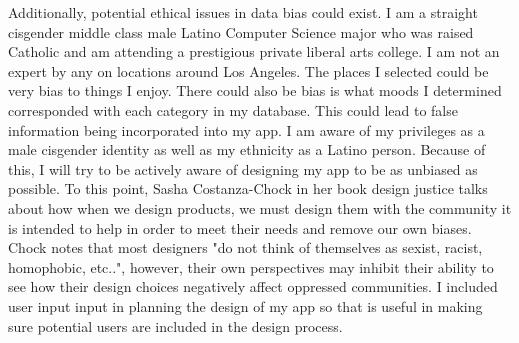 \documentclass[12pt,twocolumn]{article}
\begin{document}
Additionally, potential ethical issues in data bias could exist. I am a straight cisgender middle class male Latino Computer Science major who was raised Catholic and am attending a prestigious private liberal arts college. I am not an expert by any on locations around Los Angeles. The places I selected could be very bias to things I enjoy. There could also be bias is what moods I determined corresponded with each category in my database. This could lead to false information being incorporated into my app. I am aware of my privileges as a male cisgender identity as well as my ethnicity as a Latino person. Because of this, I will try to be actively aware of designing my app to be as unbiased as possible. To this point, Sasha Costanza-Chock in her book design justice talks about how when we design products, we must design them with the community it is intended to help in order to meet their needs and remove our own biases\cite{Chock20}. Chock notes that most designers "do not think of themselves as sexist, racist, homophobic, etc..", however, their own perspectives may inhibit their ability to see how their design choices negatively affect oppressed communities\cite{Chock20}. I included user input input in planning the design of my app so that is useful in making sure potential users are included in the design process.


\printbibliography 
\end{document}
